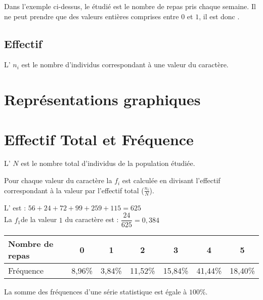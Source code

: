 \documentclass[12pt,a4paper]{article}
\begin{document}
\begin{myex}
	
	Dans l'exemple ci-dessus, le  étudié est le nombre de repas pris chaque semaine. Il ne peut prendre que des valeurs entières comprises entre $0$ et $1$, il est donc .
	
	
\end{myex}

\subsection{Effectif}

\begin{mydefs}
	L' $n_i$ est le nombre d'individus correspondant à une valeur du caractère. 
	
\end{mydefs}


\section{Représentations graphiques}

\section{Effectif Total et Fréquence}
\begin{mydefs}
	L' $N$ est le nombre total d'individus de la population étudiée.
	
	Pour chaque valeur du caractère la  $f_i$ est calculée en divisant l'effectif correspondant à la valeur par l'effectif total  ($\frac{n_i}{N}$).
\end{mydefs}		


\begin{myex}
	L' est : $56 + 24 + 72 + 99 + 259 + 115 = 625$\\
	
	La  $f_1$de la valeur $1$ du caractère est : $\dfrac{24}{625} = 0,384$ 

	\begin{center}
		
	
	\begin{tabular}{|@{\ }l@{\ }|@{\ }c@{\ }|@{\ }c@{\ }|@{\ }c@{\ }|@{\ }c@{\ }|@{\ }c@{\ }|@{\ }c@{\ }|}
		\hline
		Nombre de repas & 0 & 1 & 2 & 3 & 4 & 5 \\ \hline
		Fréquence & 8,96\% & 3,84\% & 11,52\% & 15,84\% & 41,44\% & 18,40\% \\ \hline
	\end{tabular}
	\end{center}
\end{myex}

\begin{myrem}
	La somme des fréquences d'une série statistique est égale à $100\%$.
\end{myrem}
\end{document}
